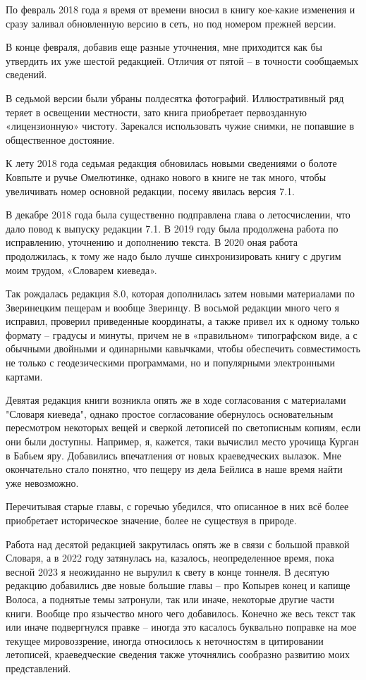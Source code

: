 По февраль 2018 года я время от времени вносил в книгу кое-какие изменения и сразу заливал обновленную версию в сеть, но под номером прежней версии.

В конце февраля, добавив еще разные уточнения, мне приходится как бы утвердить их уже шестой редакцией. Отличия от пятой – в точности сообщаемых сведений. 

В седьмой версии были убраны полдесятка фотографий. Иллюстративный ряд теряет в освещении местности, зато книга приобретает первозданную «лицензионную» чистоту. Зарекался использовать чужие снимки, не попавшие в общественное достояние.

К лету 2018 года седьмая редакция обновилась новыми сведениями о болоте Ковпыте и ручье Омелютинке, однако нового в книге не так много, чтобы увеличивать номер основной редакции, посему явилась версия 7.1.

В декабре 2018 года была существенно подправлена глава о летосчислении, что дало повод к выпуску редакции 7.1. В 2019 году была продолжена работа по исправлению, уточнению и дополнению текста. В 2020 оная работа продолжилась, к тому же надо было лучше синхронизировать книгу с другим моим трудом, «Словарем киеведа». 

Так рождалась редакция 8.0, которая дополнилась затем новыми материалами по Зверинецким пещерам и вообще Зверинцу. В восьмой редакции много чего я исправил, проверил приведенные координаты, а также привел их к одному только формату – градусы и минуты, причем не в «правильном» типографском виде, а с обычными двойными и одинарными кавычками, чтобы обеспечить совместимость не только с геодезическими программами, но и популярными электронными картами. 

Девятая редакция книги возникла опять же в ходе согласования с материалами "Словаря киеведа", однако простое согласование обернулось основательным пересмотром некоторых вещей и сверкой летописей по светописным копиям, если они были доступны. Например, я, кажется, таки вычислил место урочища Курган в Бабьем яру. Добавились впечатления от новых краеведческих вылазок. Мне окончательно стало понятно, что пещеру из дела Бейлиса в наше время найти уже невозможно.

Перечитывая старые главы, с горечью убедился, что описанное в них всё более приобретает историческое значение, более не существуя в природе.

Работа над десятой редакцией закрутилась опять же в связи с большой правкой Словаря, а в 2022 году затянулась на, казалось, неопределенное время, пока весной 2023 я неожиданно не вырулил к свету в конце тоннеля. В десятую редакцию добавились две новые большие главы – про Копырев конец и капище Волоса, а поднятые темы затронули, так или иначе, некоторые другие части книги. Вообще про язычество много чего добавилось. Конечно же весь текст так или иначе подвергнулся правке – иногда это касалось буквально поправке на мое текущее мировоззрение, иногда относилось к неточностям в цитировании летописей, краеведческие сведения также уточнялись сообразно развитию моих представлений.
 
